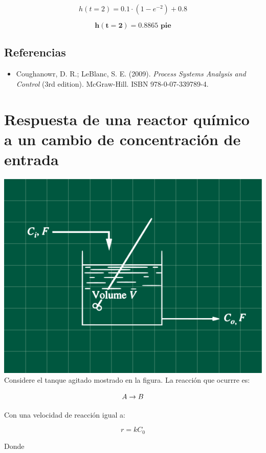 \documentclass[
  letterpaper,
  DIV=11,
  numbers=noendperiod]{scrreprt}
\providecommand{\tightlist}{%
  \setlength{\itemsep}{0pt}\setlength{\parskip}{0pt}}\usepackage{longtable,booktabs,array}
\begin{document}
\[
h(t=2)=0.1\cdot (1-e^{-2})+0.8
\]

\[
\mathbf{h(t=2)=0.8865\text{ pie}}
\]

\hypertarget{referencias-3}{%
\section{Referencias}\label{referencias-3}}

\begin{itemize}
\tightlist
\item
  Coughanowr, D. R.; LeBlanc, S. E. (2009). \emph{Process Systems
  Analysis and Control} (3rd edition). McGraw-Hill. ISBN
  978-0-07-339789-4.
\end{itemize}

\hypertarget{respuesta-de-una-reactor-quuxedmico-a-un-cambio-de-concentraciuxf3n-de-entrada}{%
\chapter{Respuesta de una reactor químico a un cambio de concentración
de
entrada}\label{respuesta-de-una-reactor-quuxedmico-a-un-cambio-de-concentraciuxf3n-de-entrada}}

\includegraphics{././images/p5.5-coughanowr/headercontrol.png} Considere
el tanque agitado mostrado en la figura. La reacción que ocurrre es:

\[
A \to B\\
\]

Con una velocidad de reacción igual a:

\[
r=kC_0
\]

Donde
\end{document}
